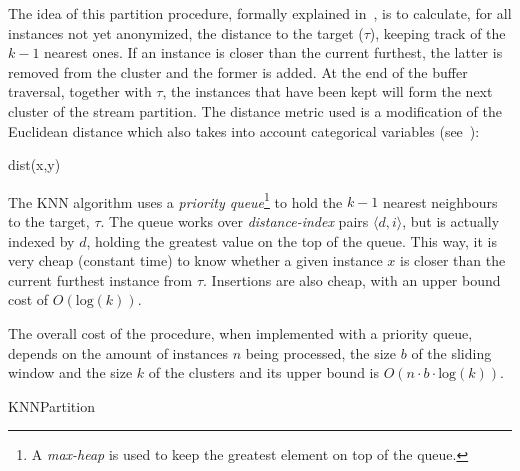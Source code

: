 The idea of this partition procedure, formally explained in~, is to calculate, for all instances not yet anonymized, the distance to the target ($\tau$), keeping track of the $k-1$ nearest ones. If an instance is closer than the current furthest, the latter is removed from the cluster and the former is added. At the end of the buffer traversal, together with $\tau$, the instances that have been kept will form the next cluster of the stream partition. The distance metric used is a modification of the Euclidean distance which also takes into account categorical variables (see~):

\begin{procedure}
\caption{dist(x,y)\label{al:distance}}
\end{procedure}

The KNN algorithm uses a \textit{priority queue}\footnote{A \textit{max-heap} is used to keep the greatest element on top of the queue.} to hold the $k-1$ nearest neighbours to the target, $\tau$. The queue works over \textit{distance-index} pairs $\langle d, i\rangle$, but is actually indexed by $d$, holding the greatest value on the top of the queue. This way, it is very cheap (constant time) to know whether a given instance $x$ is closer than the current furthest instance from $\tau$. Insertions are also cheap, with an upper bound cost of $O(\mathrm{log}(k))$.

The overall cost of the procedure, when implemented with a priority queue, depends on the amount of instances $n$ being processed, the size $b$ of the sliding window and the size $k$ of the clusters and its upper bound is $O(n \cdot b \cdot \mathrm{log}(k))$.

\begin{algorithm}
\caption{KNNPartition\label{al:KNN-partition}}
\end{algorithm}

